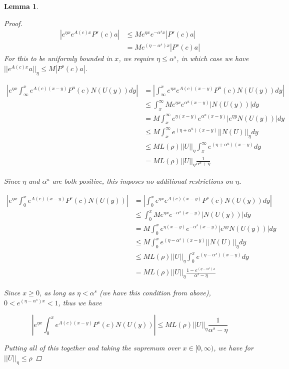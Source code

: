 \documentclass[12pt]{article}
\newtheorem{lemma}{Lemma}
\begin{document}
\begin{lemma}
\begin{proof}
\begin{align*}
|e^{\eta x} e^{A(c)x } P^s(c) a | &\leq M e^{\eta x} e^{-\alpha^s x} | P^s(c) a |\\
&= M e^{(\eta - \alpha^s)x} | P^s(c) a|
\end{align*}
For this to be uniformly bounded in $x$, we require $\eta \leq \alpha^s$, in which case we have $||e^{A(c)x}a ||_\eta \leq M| P^s(c) a |$.

\begin{align*}
\left| e^{\eta x} \int_\infty^x e^{A(c)(x - y)}P^u(c) N(U(y))dy \right| &= \left| \int_\infty^x e^{\eta x} e^{A(c)(x - y)}P^u(c) N(U(y))dy \right|\\
&\leq \int_x^\infty M e^{\eta x}e^{\alpha^u(x -y)}|N(U(y))|dy \\
&= M \int_x^\infty e^{\eta (x - y)}e^{\alpha^u(x -y)}| e^{\eta y} N(U(y))|dy \\
&\leq M \int_x^\infty e^{(\eta+\alpha^u)(x - y)} || N(U)||_\eta dy \\
&\leq M L(\rho) ||U||_\eta \int_x^\infty e^{(\eta+\alpha^u)(x - y)} dy \\
&= M L(\rho) ||U||_\eta \frac{1}{\alpha^u + \eta}
\end{align*}

Since $\eta$ and $\alpha^u$ are both positive, this imposes no additional restrictions on $\eta$.

\begin{align*}
\left| e^{\eta x} \int_0^x e^{A(c)(x - y)}P^s(c) N(U(y)) \right| &= \left| \int_0^x e^{\eta x} e^{A(c)(x - y)}P^s(c) N(U(y)) dy \right|\\
&\leq \int_0^x M e^{\eta x}e^{-\alpha^s(x -y)}|N(U(y))|dy \\
&= M \int_0^x e^{\eta (x - y)}e^{-\alpha^s(x -y)}| e^{\eta y} N(U(y))|dy \\
&\leq M \int_0^x e^{(\eta-\alpha^s)(x - y)} || N(U)||_\eta dy \\
&\leq M L(\rho) ||U||_\eta \int_0^x e^{(\eta-\alpha^s)(x - y)} dy \\
&= M L(\rho) ||U||_\eta \frac{1 - e^{(\eta-\alpha^s)x} }{\alpha^s - \eta}
\end{align*}

Since $x \geq 0$, as long as $\eta < \alpha^s$ (we have this condition from above), $0 < e^{(\eta-\alpha^s)x} < 1$, thus we have

\[
\left| e^{\eta x} \int_0^x e^{A(c)(x - y)}P^s(c) N(U(y)) \right| \leq M L(\rho) ||U||_\eta \frac{1}{\alpha^s - \eta}
\]

Putting all of this together and taking the supremum over $x \in [0, \infty)$, we have for $||U||_\eta \leq \rho$


\end{proof}
\end{lemma}
\end{document}

